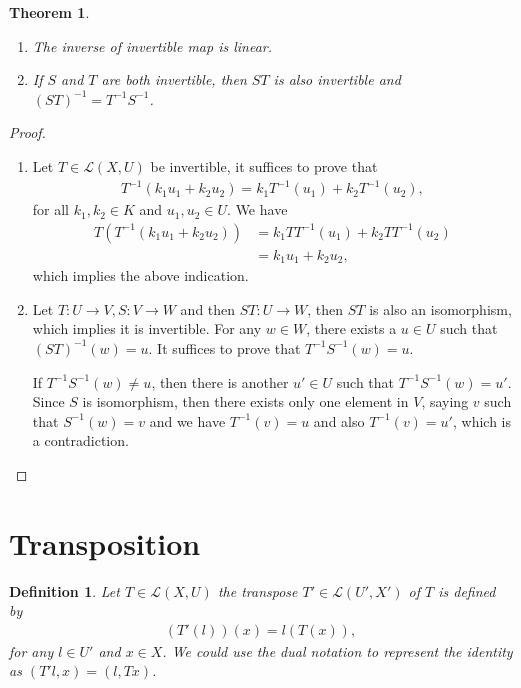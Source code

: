 \documentclass[11pt]{book}
\newtheorem{definition}{Definition}[chapter]
\newtheorem{theorem}{Theorem}[chapter]
\theoremstyle{definition}
\numberwithin{equation}{chapter}
\begin{document}
\begin{theorem}
~\begin{enumerate}[label=(\alph*)]
    \item The inverse of invertible map is linear.
    \item If $S$ and $T$ are both invertible, then $ST$ is also invertible and $(ST)^{-1} = T^{-1} S^{-1}$.
\end{enumerate}
\end{theorem}
\begin{proof}
~\begin{enumerate}[label=(\alph*)]
    \item Let $T\in \mathscr{L}(X,U)$ be invertible, it suffices to prove that 
    \begin{align*}
        T^{-1}(k_1 u_1+k_2 u_2) = k_1 T^{-1}(u_1) + k_2 T^{-1}(u_2),
    \end{align*}
    for all $k_1,k_2\in K$ and $u_1,u_2\in U$. We have
    \begin{align*}
        T \left(T^{-1}(k_1 u_1+k_2 u_2)\right) & = k_1 TT^{-1}(u_1) + k_2 TT^{-1}(u_2) \\
        & = k_1 u_1 + k_2 u_2,
    \end{align*}
    which implies the above indication.
    \item Let $T:U\to V, S:V\to W$ and then $ST:U\to W$, then $ST$ is also an isomorphism, which implies it is invertible. For any $w\in W$, there exists a $u\in U$ such that $(ST)^{-1}(w) = u$. It suffices to prove that $T^{-1} S^{-1}(w) = u$.
    
    If $T^{-1} S^{-1}(w)\neq u$, then there is another $u'\in U$ such that $T^{-1} S^{-1}(w) = u'$. Since $S$ is isomorphism, then there exists only one element in $V$, saying $v$ such that $S^{-1}(w) = v$ and we have $T^{-1}(v) = u$ and also $T^{-1}(v) = u'$, which is a contradiction.
\end{enumerate}
\end{proof}

\medskip

\section{Transposition}
\begin{definition}
Let $T\in \mathscr{L}(X,U)$ the transpose $T'\in \mathscr{L}(U',X')$ of $T$ is defined by 
\begin{align*}
    \left(T'(l)\right)(x) = l(T(x)),
\end{align*}
for any $l\in U'$ and $x\in X$. We could use the dual notation to represent the identity as $(T' l,x) = (l, Tx)$.
\end{definition}
\end{document}
